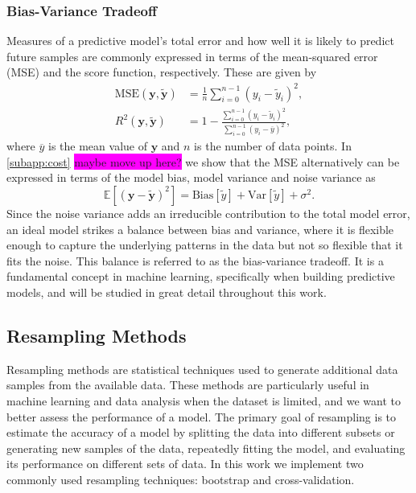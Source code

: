 \documentclass[aps,pra,english,notitlepage,reprint,nofootinbib]{revtex4-1}  %
\begin{document}
\subsubsection{Bias-Variance Tradeoff}
Measures of a predictive model's total error and how well it is likely to predict future samples are commonly expressed in terms of the mean-squared error (MSE) and the score function, respectively. These are given by
\begin{align}
  \text{MSE}(\mathbf{y},\mathbf{\tilde{y}}) &= \frac{1}{n}\sum_{i=0}^{n-1}\left(y_i-\tilde{y}_i\right)^2,
  \\
  R^2(\mathbf{y},\mathbf{\tilde{y}}) &= 1 -\frac{\sum_{i=0}^{n-1}\left(y_i-\tilde{y}_i\right)^2}{\sum_{i=0}^{n-1}\left(y_i-\overline{y}\right)^2},
\end{align}
where $\overline{y}$ is the mean value of $\mathbf{y}$ and $n$ is the number of data points. In \cref{subapp:cost} \colorbox{magenta}{maybe move up here?} we show that the MSE alternatively can be expressed in terms of the model bias, model variance and noise variance as 
\begin{equation}
  \mathbb{E}\left[(\mathbf{y}-\mathbf{\tilde{y}})^2 \right] = \text{Bias}[\tilde{y}] + \text{Var}[\tilde{y}] + \sigma^2. \label{eq:model error}
\end{equation}
Since the noise variance adds an irreducible contribution to the total model error, an ideal model strikes a balance between bias and variance, where it is flexible enough to capture the underlying patterns in the data but not so flexible that it fits the noise. This balance is referred to as the bias-variance tradeoff. It is a fundamental concept in machine learning, specifically when building predictive models, and will be studied in great detail throughout this work.


\subsection{Resampling Methods}
Resampling methods are statistical techniques used to generate additional data samples from the available data. These methods are particularly useful in machine learning and data analysis when the dataset is limited, and we want to better assess the performance of a model. The primary goal of resampling is to estimate the accuracy of a model by splitting the data into different subsets or generating new samples of the data, repeatedly fitting the model, and evaluating its performance on different sets of data. In this work we implement two commonly used resampling techniques: bootstrap and cross-validation.
\end{document}
